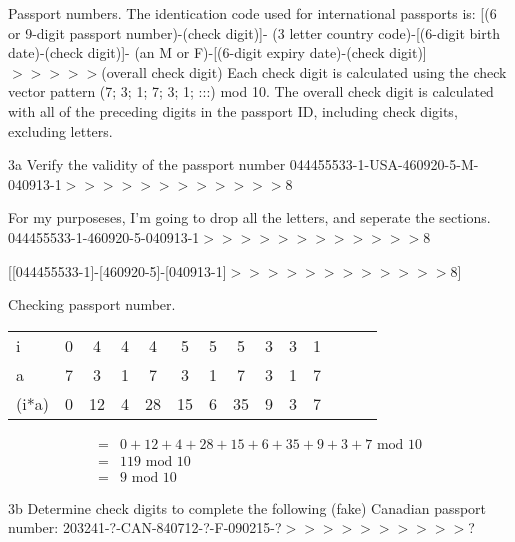 \begin{question}{3}
Passport numbers. The identication code used for international passports is:
[(6 or 9-digit passport number)-(check digit)]-
(3 letter country code)-[(6-digit birth date)-(check digit)]-
(an M or F)-[(6-digit expiry date)-(check digit)]$>>>>>$(overall check digit)
Each check digit is calculated using the check vector pattern (7; 3; 1; 7; 3; 1; :::) mod 10.
The overall check digit is calculated with all of the preceding digits in the passport ID,
including check digits, excluding letters.
\end{question}


\begin{question}{3a}
Verify the validity of the passport number
044455533-1-USA-460920-5-M-040913-1$>>>>>>>>>>>>$8

For my purposeses, I'm going to drop all the letters, and seperate the sections.
044455533-1-460920-5-040913-1$>>>>>>>>>>>>$8

[[044455533-1]-[460920-5]-[040913-1]$>>>>>>>>>>>>$8]

Checking passport number.

\begin{tabular}{l|ccccccccccccc}
\hline
i     & 0  & 4  & 4  & 4  & 5  & 5  & 5  & 3  & 3  & 1\\
a     & 7  & 3  & 1  & 7  & 3  & 1  & 7  & 3  & 1  & 7\\
\hline
(i*a) & 0  & 12 & 4  & 28 & 15 & 6  & 35 & 9  & 3  & 7
\end{tabular}

\begin{align*}
=& 0  + 12 + 4  + 28 + 15 + 6  + 35 + 9  + 3 + 7 \textrm{ mod } 10\\
=& 119 \textrm{ mod } 10\\
=& 9 \textrm{ mod } 10
\end{align*}


\begin{question}{3b}
Determine check digits to complete the following (fake) Canadian passport number:
203241-?-CAN-840712-?-F-090215-?$>>>>>>>>>>$?
\end{question}


\end{question}
